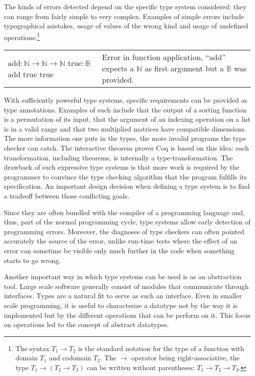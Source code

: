 The kinds of errors detected depend on the specific type system considered: they can range from
fairly simple to very complex. Examples of simple errors include typographical mistakes, usage of
values of the wrong kind and usage of undefined operations:\footnote{The syntax $T_1 \to T_2$ is the
standard notation for the type of a function with domain $T_1$ and codomain $T_2$. The $\to$
operator being right-associative, the type $T_1 \to (T_2 \to T_3)$ can be written without
parentheses: $T_1 \to T_2 \to T_3$.}

\begin{center}
  \begin{tabular}{m{3.5cm} | m{5.5cm}}
    $\text{add} : \mathbb{N} \to \mathbb{N} \to \mathbb{N}$ \newline
    $\text{true} : \mathbb{B}$ \newline
    add true true
    & Error in function application, ``add'' expects a $\mathbb{N}$ as first argument but a
    $\mathbb{B}$ was provided.
  \end{tabular}
\end{center}

With sufficiently powerful type systems, specific requirements can be provided as type annotations.
Examples of such include that the output of a sorting function is a permutation of its input, that
the argument of an indexing operation on a list is in a valid range and that two multiplied matrices
have compatible dimensions. The more information one puts in the types, the more invalid programs
the type checker can catch. The interactive theorem prover Coq is based on this idea: each
transformation, including theorems, is internally a type-transformation. The drawback of such
expressive type systems is that more work is required by the programmer to convince the type
checking algorithm that the program fulfills its specification.  An important design decision when
defining a type system is to find a tradeoff between those conflicting goals.

Since they are often bundled with the compiler of a programming language and, thus, part of the
normal programming cycle, type systems allow early detection of programming errors. Moreover, the
diagnoses of type checkers can often pointed accurately the source of the error, unlike run-time
tests where the effect of an error can sometime be visible only much further in the code when
something starts to go wrong.

Another important way in which type systems can be used is as an abstraction tool. Large scale
software generally consist of modules that communicate through interfaces. Types are a natural fit
to serve as such an interface. Even in smaller scale programming, it is useful to characterize a
datatype not by the way it is implemented but by the different operations that can be perform on it.
This focus on operations led to the concept of abstract datatypes.


